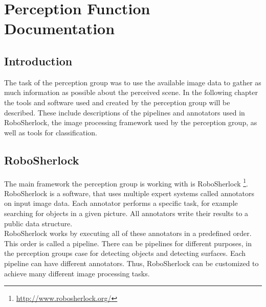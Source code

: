 \documentclass[main.tex]{subfiles}
\begin{document}
\begingroup

\renewcommand{\cleardoublepage}{}

\renewcommand{\clearpage}{}
\newpage
\chapter{Perception Function Documentation}

\section{Introduction}
The task of the perception group was to use the available image data to gather as much information as possible about the perceived scene. In the following chapter the tools and software used and created by the perception group will be described. These include descriptions of the pipelines and annotators used in RoboSherlock, the image processing framework used by the perception group, as well as tools for classification.

\section{RoboSherlock}
The main framework the perception group is working with is RoboSherlock \footnote{\url{http://www.robosherlock.org/}}. RoboSherlock is a software, that uses multiple expert systems called annotators on input image data. Each annotator performs a specific task, for example searching for objects in a given picture. All annotators write their results to a public data structure.\\
		
RoboSherlock works by executing all of these annotators in a predefined order. This order is called a pipeline. There can be pipelines for different purposes, in the perception groups case for detecting objects and detecting surfaces. Each pipeline can have different annotators. Thus, RoboSherlock can be customized to achieve many different image processing tasks.
\end{document}
